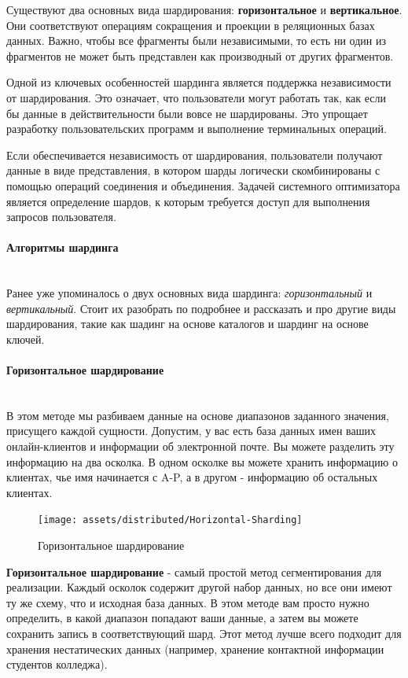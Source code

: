 Существуют два основных вида шардирования: \textbf{горизонтальное} и \textbf{вертикальное}. Они соответствуют операциям сокращения и проекции в реляционных базах данных. Важно, чтобы все фрагменты были независимыми, то есть ни один из фрагментов не может быть представлен как производный от других фрагментов.

Одной из ключевых особенностей шардинга является поддержка независимости от шардирования. Это означает, что пользователи могут работать так, как если бы данные в действительности были вовсе не шардированы. Это упрощает разработку пользовательских программ и выполнение терминальных операций.

Если обеспечивается независимость от шардирования, пользователи получают данные в виде представления, в котором шарды логически скомбинированы с помощью операций соединения и объединения. Задачей системного оптимизатора является определение шардов, к которым требуется доступ для выполнения запросов пользователя.
\autocite{IntroBD2014}

\paragraph{Алгоритмы шардинга} ~\\
Ранее уже упоминалось о двух основных вида шардинга: \textit{горизонтальный} и \textit{вертикальный}. Стоит их разобрать по подробнее и
рассказать и про другие виды шардирования, такие как шадинг на основе каталогов и шардинг на основе ключей.

\paragraph{Горизонтальное шардирование} ~\\
В этом методе мы разбиваем данные на основе диапазонов заданного значения, присущего каждой сущности. Допустим, у вас
есть база данных имен ваших онлайн-клиентов и информации об электронной почте. Вы можете разделить эту информацию на
два осколка. В одном осколке вы можете хранить информацию о клиентах, чье имя начинается с A-P, а в другом - информацию
об остальных клиентах.

\begin{figure}[H]
    \centering
    \texttt{[image: assets/distributed/Horizontal-Sharding]}
    \caption{Горизонтальное шардирование}
    \label{fig:Horizontal-Sharding}
\end{figure}

\textbf{Горизонтальное шардирование} - самый простой метод сегментирования для реализации. Каждый осколок содержит
другой набор данных, но все они имеют ту же схему, что и исходная база данных. В этом методе вам просто нужно
определить, в какой диапазон попадают ваши данные, а затем вы можете сохранить запись в соответствующий шард. Этот
метод лучше всего подходит для хранения нестатических данных (например, хранение контактной информации студентов
колледжа).

